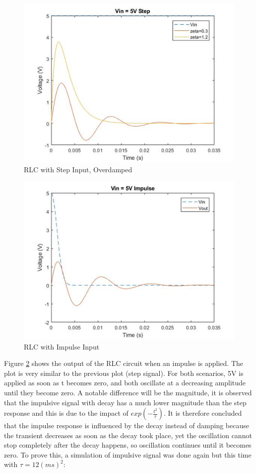 \documentclass[11pt, oneside, titlepage]{article}   	%
\begin{document}
\begin{figure}[H]
\center
\includegraphics[scale = 0.5]{exercise3_3}
\caption{RLC with Step Input, Overdamped} \label{fig:ex3_3}
\end{figure}

\begin{figure}[H]
\center
\includegraphics[scale = 0.5]{exercise3_4}
\caption{RLC with Impulse Input} \label{fig:ex3_4}
\end{figure}

Figure \ref{fig:ex3_4} shows the output of the RLC circuit when an impulse is applied. The plot is very similar to the previous plot (step signal). For both scenarios, 5V is applied as soon as t becomes zero, and both oscillate at a decreasing amplitude until they become zero. A notable difference will be the magnitude, it is observed that the impulsive signal with decay has a much lower magnitude than the step response and this is due to the impact of $exp(-\frac{t^2}{\tau})$. It is therefore concluded that the impulse response is influenced by the decay instead of damping because the transient decreases as soon as the decay took place, yet the oscillation cannot stop completely after the decay happens, so oscillation continues until it becomes zero. To prove this, a simulation of impulsive signal was done again but this time with $\tau = 12 (ms)^2$:
\end{document}
